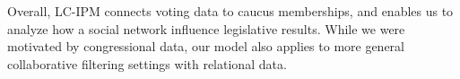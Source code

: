 \documentclass{article}
\begin{document}
Overall, LC-IPM connects voting data to caucus memberships, and enables us to analyze how a social network influence legislative results. While we were motivated by congressional data, our model also applies to more general collaborative filtering settings with relational data.

\newpage



%
%
\end{document}
